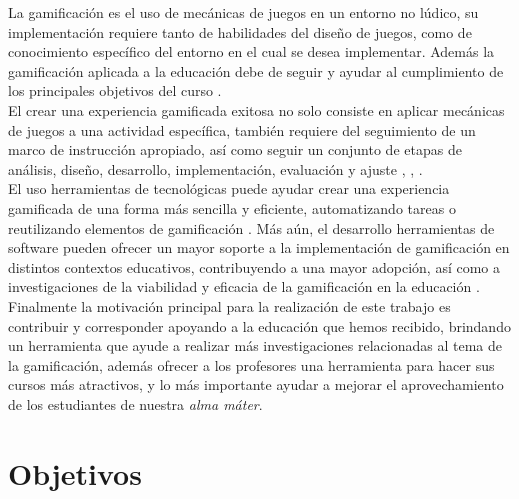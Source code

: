 
 \noindent La gamificación es el uso de mecánicas de juegos en un entorno no lúdico, su implementación requiere
 tanto de habilidades del diseño de juegos, como de conocimiento específico del entorno en el cual se desea
 implementar. Además la gamificación aplicada a la educación debe de seguir y ayudar al cumplimiento de los
 principales objetivos del curso \cite{ForTheWin}.\\ %


 \noindent El crear una experiencia gamificada exitosa no solo consiste en aplicar mecánicas de juegos a una
 actividad específica, también requiere del seguimiento de un marco de instrucción apropiado, así como seguir
 un conjunto de etapas de análisis, diseño, desarrollo, implementación, evaluación y ajuste
 \cite[p. 39]{Octalysis}, \cite[p. 1110]{GamInE-Learning}, \cite{ForTheWin}.\\


 \noindent El uso herramientas de tecnológicas puede ayudar crear una experiencia gamificada de una
 forma más sencilla y eficiente, automatizando tareas o reutilizando elementos de gamificación \cite{Wood-Reiners}.
 Más aún, el desarrollo herramientas de software pueden ofrecer un mayor soporte a la implementación de
 gamificación en distintos contextos educativos, contribuyendo a una mayor adopción, así como a investigaciones
 de la viabilidad y eficacia de la gamificación en la educación \cite[p. 10]{mappingStudy}.\\


 \noindent Finalmente la motivación principal para la realización de este trabajo es contribuir y corresponder
 apoyando a la educación que hemos recibido, brindando un herramienta que ayude a realizar más investigaciones
 relacionadas al tema de la gamificación, además ofrecer a los profesores una herramienta para hacer sus cursos más
 atractivos, y lo más importante ayudar a mejorar el aprovechamiento de los estudiantes de nuestra {\it alma máter}.



\section{Objetivos} \label{sec:objetivos}

